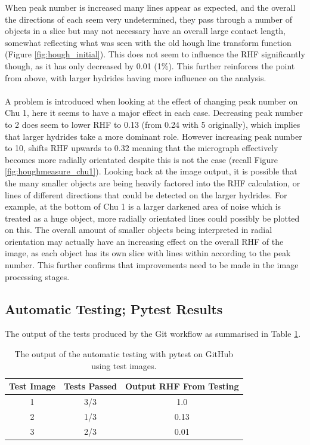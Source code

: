 \documentclass{article}
\begin{document}
    When peak number is increased many lines appear as expected, and the overall the directions of each seem very undetermined, they pass through a number of objects in a slice but may not necessary have an overall large contact length, somewhat reflecting what was seen with the old hough line transform function (Figure \ref{fig:hough_initial}). This does not seem to influence the RHF significantly though, as it has only decreased by 0.01 (1\%). This further reinforces the point from above, with larger hydrides having more influence on the analysis.
    \\
    \\
    A problem is introduced when looking at the effect of changing peak number on Chu 1, here it seems to have a major effect in each case. Decreasing peak number to 2 does seem to lower RHF to 0.13 (from 0.24 with 5 originally), which implies that larger hydrides take a more dominant role. However increasing peak number to 10, shifts RHF upwards to 0.32 meaning that the micrograph effectively becomes more radially orientated despite this is not the case (recall Figure \ref{fig:houghmeasure_chu1}). Looking back at the image output, it is possible that the many smaller objects are being heavily factored into the RHF calculation, or lines of different directions that could be detected on the larger hydrides. For example, at the bottom of Chu 1 is a larger darkened area of noise which is treated as a huge object, more radially orientated lines could possibly be plotted on this. The overall amount of smaller objects being interpreted in radial orientation may actually have an increasing effect on the overall RHF of the image, as each object has its own slice with lines within according to the peak number. This further confirms that improvements need to be made in the image processing stages. 
    
\subsection{Automatic Testing; Pytest Results}
    The output of the tests produced by the Git workflow as summarised in Table \ref{TestResults}.

    \begin{table}[h]
        \centering
        \begin{tabular}{|c|c|c|}
        \hline
            \textbf{Test Image} & \textbf{Tests Passed} & \textbf{Output RHF From Testing}  \\
            \hline
            1 & 3/3 & 1.0 \\
            \hline
            2 & 1/3 & 0.13 \\
            \hline
            3 & 2/3 & 0.01 \\
            \hline
        \end{tabular}
        \caption{The output of the automatic testing with pytest on GitHub using test images.}
        \label{TestResults}
    \end{table}
\end{document}
